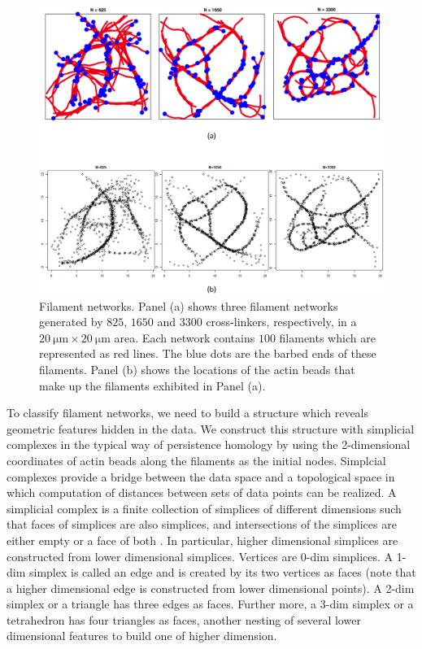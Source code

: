 \documentclass[10pt]{article}
\begin{document}
\begin{figure}[tbp]
	\begin{center}
		\includegraphics[width=1\textwidth]{rawdata.png}
	\end{center}
	\caption{Filament networks. Panel (a) shows three filament networks generated by $825$, $1650$ and $3300$ cross-linkers, respectively, in a $\SI{20}{\micro\metre} \times \SI{20}{\micro\metre}$ area. Each network contains $100$ filaments which are represented as red lines. The blue dots are the barbed ends of these filaments. Panel (b) shows the locations of the actin beads that make up the filaments exhibited in Panel (a).}
	\label{fig:rawdata}
\end{figure}


To classify filament networks, we need to build a structure which reveals geometric features hidden in the data. We construct this structure with simplicial complexes in the typical way of persistence homology by using the 2-dimensional coordinates of actin beads along the filaments as the initial nodes. Simplcial complexes provide a bridge between the data space and a topological space in which computation of distances between sets of data points can be realized. A simplicial complex is a finite collection of simplices of different dimensions such that faces of simplices are also simplices, and intersections of the simplices are either empty or a face of both \cite{edelsbrunner2010computational}. In particular, higher dimensional simplices are constructed from lower dimensional simplices. Vertices are 0-dim simplices. A 1-dim simplex is called an edge and is created by its two vertices as faces (note that a higher dimensional edge is constructed from lower dimensional points). A 2-dim simplex or a triangle has three edges as faces. Further more, a 3-dim simplex or a tetrahedron has four triangles as faces, another nesting of several lower dimensional features to build one of higher dimension.
\end{document}
